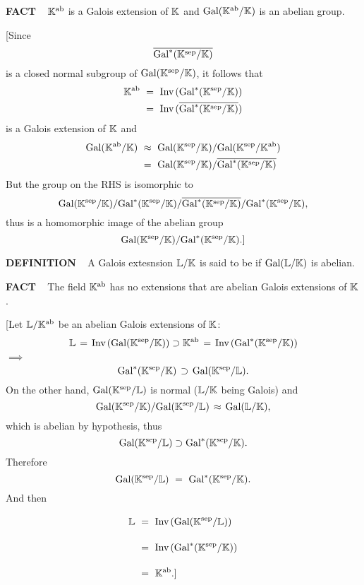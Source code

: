 \begin{x}{\small\bf FACT} \ %
$\K^\ab$ is a Galois extension of $\K$ and $\Gal(\K^\ab/\K)$ is an abelian group.

\vspace{0.1cm}

[Since
\[
\ov{\Gal^*(\K^\sep/\K)}
\]
is a closed normal subgroup of $\Gal(\K^\sep/\K)$, it follows that
\begin{align*}
\K^\ab \ 
&=\ \Inv ( \Gal^*(\K^\sep/\K) )\\
&=\ \Inv(\ov{\Gal^*(\K^\sep/\K)})
\end{align*}
is a Galois extension of  $\K$ and
\begin{align*}
\Gal(\K^\ab/\K) \ 
&\approx\ \Gal(\K^\sep/\K) / \Gal(\K^\sep/\K^\ab)\\
&=\ \Gal(\K^\sep/\K) / \ov{\Gal^*(\K^\sep/\K)}
\end{align*}
But the group on the RHS is isomorphic to 
\[
\Gal(\K^\sep/\K) / \Gal^*(\K^\sep/\K) / \ov{\Gal^*(\K^\sep/\K)} / \Gal^*(\K^\sep/\K),
\]
thus is a homomorphic image of the abelian group
\[
\Gal(\K^\sep/\K) / \Gal^*(\K^\sep/\K).]
\]
\end{x}

\vspace{0.1cm}


\begin{x}{\small\bf DEFINITION} \ %
A Galois extesnsion $\LL/\K$ is said to be 
\un{abelian}
if $\Gal(\LL/\K)$ is abelian.
\end{x}

\vspace{0.1cm}

\begin{x}{\small\bf FACT} \ %
The field $\K^\ab$ has no extensions that are abelian Galois extensions of $\K$.

\vspace{0.1cm}

[Let $\LL/\K^\ab$ be an abelian Galois extensions of $\K$:
\[
\LL \hsx = \hsx \Inv(\Gal(\K^\sep/\K)) \supset \K^\ab \hsx = \hsx \Inv(\Gal^*(\K^\sep/\K))
\]
\qquad\qquad $\implies$
\[
\Gal^*(\K^\sep/\K) \hsx\supset\hsx \Gal(\K^\sep/\LL).
\]
On the other hand, $\Gal(\K^\sep/\LL)$ is normal ($\LL/\K$ being Galois) and 
\[
\Gal(\K^\sep/\K) /  \Gal(\K^\sep/\LL) \hsx \approx \hsx \Gal(\LL/\K),
\]
which is abelian by hypothesis, thus
\[
\Gal(\K^\sep/\LL) \supset \Gal^*(\K^\sep/\K).
\]
Therefore
\[
\Gal(\K^\sep/\LL) \ = \  \Gal^*(\K^\sep/\K).
\]
And then
\begin{align*}
\LL \ 
&\vsy=\ \Inv(\Gal(\K^\sep/\LL))\\
&\vsy=\ \Inv(\Gal^*(\K^\sep/\K))\\
&\vsy=\ \K^\ab.]
\end{align*}
\end{x}

